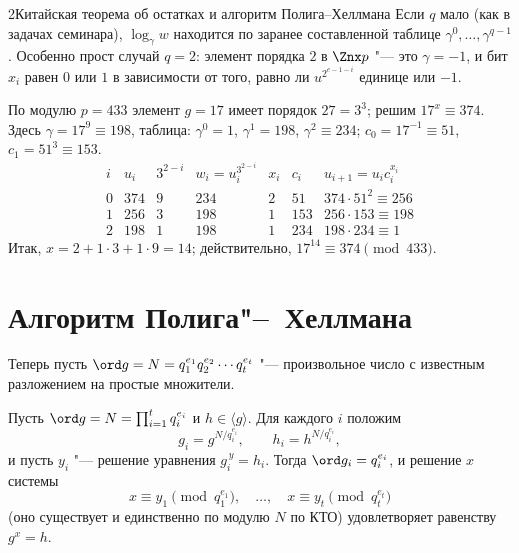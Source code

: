 \begin{lecture}{2}{Китайская теорема об остатках и алгоритм Полига–Хеллмана}
Если $q$ мало (как в задачах семинара), $\log_\gamma w$ находится по заранее составленной
таблице $\gamma^0, \dots, \gamma^{q-1}$. Особенно прост случай $q = 2$: элемент порядка $2$
в $\Znx p$ "--- это $\gamma = -1$, и бит $x_i$ равен $0$ или $1$ в зависимости от того, равно ли
$u^{2^{e-1-i}}$ единице или $-1$.

\begin{example}\label{l2:ex-digits}
По модулю $p = 433$ элемент $g = 17$ имеет порядок $27 = 3^3$; решим $17^x \equiv 374$.
Здесь $\gamma = 17^9 \equiv 198$, таблица: $\gamma^0 = 1$, $\gamma^1 = 198$, $\gamma^2 \equiv 234$;
$c_0 = 17^{-1} \equiv 51$, $c_1 = 51^3 \equiv 153$.
\[
\begin{array}{c|r|c|r|c|r|r}
  i & u_i & 3^{2-i} & w_i = u_i^{3^{2-i}} & x_i & c_i & u_{i+1} = u_i c_i^{x_i} \\ \hline
  0 & 374 & 9 & 234 & 2 & 51 & 374 \cdot 51^2 \equiv 256 \\
  1 & 256 & 3 & 198 & 1 & 153 & 256 \cdot 153 \equiv 198 \\
  2 & 198 & 1 & 198 & 1 & 234 & 198 \cdot 234 \equiv 1
\end{array}
\]
Итак, $x = 2 + 1 \cdot 3 + 1 \cdot 9 = 14$; действительно, $17^{14} \equiv 374 \pmod{433}$.
\end{example}




\section{Алгоритм Полига"--~Хеллмана}

Теперь пусть $\ord g = N = q_1^{e_1} q_2^{e_2} \cdots q_t^{e_t}$ "--- произвольное число с известным
разложением на простые множители.

\begin{theorem}\label{l2:ph}
Пусть $\ord g = N = \prod_{i=1}^{t} q_i^{e_i}$ и $h \in \langle g \rangle$. Для каждого $i$ положим
\[
  g_i = g^{N / q_i^{e_i}}, \qquad h_i = h^{N / q_i^{e_i}} ,
\]
и пусть $y_i$ "--- решение уравнения $g_i^{\,y} = h_i$. Тогда $\ord g_i = q_i^{e_i}$, и решение $x$
системы
\[
  x \equiv y_1 \pmod{q_1^{e_1}}, \quad \dots, \quad x \equiv y_t \pmod{q_t^{e_t}}
\]
(оно существует и единственно по модулю $N$ по КТО) удовлетворяет равенству $g^x = h$.
\end{theorem}


\end{lecture}
